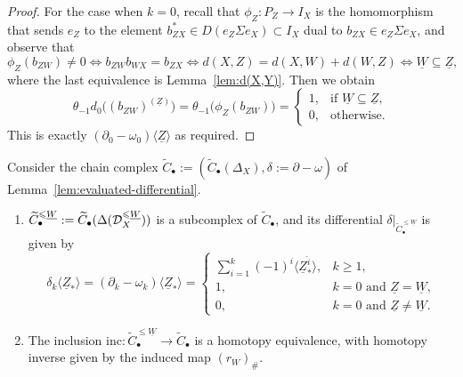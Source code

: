 \documentclass[a4paper,leqno]{amsart}
\begin{document}
\begin{proof}
For the case when $k=0$, recall that $\phi_Z:P_Z\to I_X$ is the homomorphism that sends $e_Z$ to the element $b_{ZX}^*\in D(e_Z \Sigma e_X )\subset I_X$ dual to $b_{ZX}\in e_Z \Sigma e_X$, and observe that
\[
 \phi_Z(b_{ZW})\neq0
 \iff b_{ZW}b_{WX}=b_{ZX}
 \iff d(X,Z)=d(X,W)+d(W,Z)
 \iff \underline{W}\subseteq\underline{Z},
\]
where the last equivalence is Lemma~\ref{lem:d(X,Y)}.
Then we obtain 
\[
\theta_{-1}d_0\bigl((b_{ZW})^{(\underline{Z})}\bigr) = \theta_{-1}\big(\phi_Z(b_{ZW})\big) = \begin{cases}
    1, &\text{if }\underline{W}\subseteq\underline{Z},\\
    0, &\text{otherwise}.
\end{cases}
\]
This is exactly $(\partial_0-\omega_0)\langle\underline{Z}\rangle$ as required.
\end{proof}

\begin{lem}\label{lem:perturbed-retraction}
Consider the chain complex $\widetilde{C}_\bullet:=(\widetilde C_\bullet(\Delta_X), \delta:=\partial-\omega)$ of Lemma~\ref{lem:evaluated-differential}.
\begin{enumerate}[(1)]
\item $\widetilde{C}^{\leqslant\underline{W}}_\bullet:=\widetilde{C}_\bullet(\Delta(\mathcal D_X^{\leqslant\underline{W}}))$ is a subcomplex of $\widetilde{C}_\bullet$, and its differential $\delta|_{\widetilde{C}^{\leq\underline{W}}_\bullet}$ is given by
\[
 \delta_k\langle\underline{Z}_\ast\rangle=(\partial_k-\omega_k)\langle\underline{Z}_\ast\rangle=
 \begin{cases}
 \sum_{i=1}^k(-1)^i\langle\underline{Z}_\ast^{\widehat{i}}\rangle, & k\geq1,\\
 1, & k=0 \text{ and }\underline{Z}=\underline{W},\\
 0, & k=0 \text{ and }\underline{Z}\neq \underline{W}.
 \end{cases}
\]
\item The inclusion $\mathrm{inc}\colon \widetilde{C}^{\leq\underline{W}}_\bullet\to \widetilde{C}_\bullet$ is a homotopy equivalence, with homotopy inverse given by the induced map $(r_W)_\#$.
\end{enumerate}
\end{lem}
\end{document}
